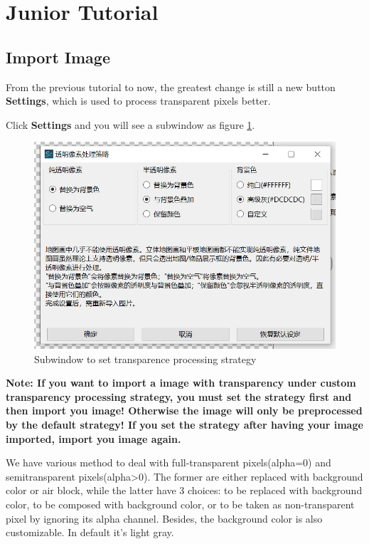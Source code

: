 \documentclass{article}
\begin{document}
    \pagebreak
    \section{Junior Tutorial}
    \subsection{Import Image}
    From the previous tutorial to now, the greatest change is still a new button \textbf{Settings}, which is used to process transparent pixels better.
 
    Click \textbf{Settings} and you will see a subwindow as figure \ref*{SetTPS}.

    \begin{figure}[htbp]
        \centering
        \includegraphics[width=15cm]{Img1_TPS.png}
        \caption{Subwindow to set transparence processing strategy}
        \label{SetTPS}
    \end{figure}
    
    \textbf{Note: If you want to import a image with transparency under custom transparency processing strategy, you must set the strategy first and then import you image! Otherwise the image will only be preprocessed by the default strategy! If you set the strategy after having your image imported, import you image again.}

    We have various method to deal with full-transparent pixels(alpha=0) and semitransparent pixels(alpha>0). The former are either replaced with background color or air block, while the latter have 3 choices: to be replaced with background color, to be composed with background color, or to be taken as non-transparent pixel by ignoring its alpha channel. Besides, the background color is also customizable. In default it's light gray.
\end{document}

